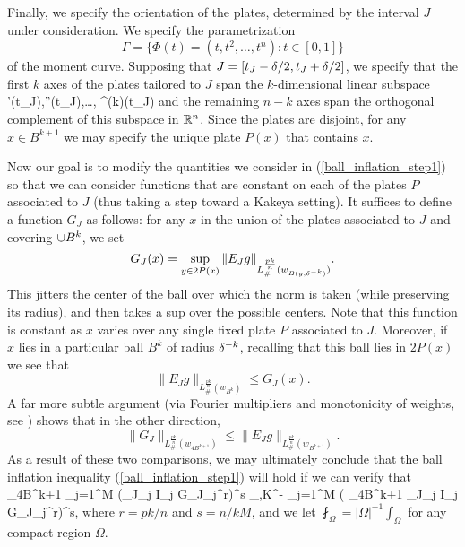 \documentclass[brochure,english,12pt]{bourbaki}%
\begin{document}
Finally, we specify the orientation of the plates, determined by the interval $J$ under consideration. We specify the parametrization 
\[ \Gamma = \{\Phi(t) = (t,t^2,\ldots, t^n): t \in [0,1]\}\]
of the moment curve. Supposing that $J = [t_J - \delta/2,t_J +\delta/2]$, we specify that the first $k$ axes of the plates tailored to $J$ span the $k$-dimensional linear subspace 
\beq\label{plate_orientation}
 \langle \Phi'(t_J),\Phi''(t_J),\ldots, \Phi^{(k)}(t_J)\rangle 
 \eeq
and the remaining $n-k$ axes span the orthogonal complement of this subspace in $\mathbb{R}^n$. 
Since the plates are disjoint, for any $x \in B^{k+1}$ we may specify the unique plate $P(x)$ that contains $x$. 


Now our goal is to modify the quantities we consider in (\ref{ball_inflation_step1}) so that we can consider functions that are constant on each of the plates $P$ associated to $J$ (thus taking a step toward a Kakeya setting). 
It suffices to define a function $G_J$ as follows: for any $x$ in the union of the plates associated to $J$ and covering $\cup B^k$, we set 
\[ G_J (x) = \sup_{y \in 2P(x)} \| E_J g\|_{L^{\frac{pk}{n}}_\# (w_{B(y,\delta^{-k})})}.\]
This jitters the center of the ball over which the norm is taken (while preserving its radius), and then takes a sup over the possible centers. Note that this function is constant as $x$ varies over any single fixed plate $P$ associated to $J$. Moreover, if $x$ lies in a particular ball $B^k$ of radius $\delta^{-k}$, recalling that this ball lies in $2P(x)$ we see that 
\[ \| E_J g\|_{L^{\frac{pk}{n}}_\# (w_{B^k})} \leq G_J(x).\]
A far more subtle argument (via Fourier multipliers and monotonicity of weights, see \cite[Thm. 6.6]{BDG16}) shows that in the other direction,
\[  \| G_J \|_{L^{\frac{pk}{n}}_\# (w_{4B^{k+1}})} \leq  \| E_J g\|_{L^{\frac{pk}{n}}_\# (w_{B^{k+1}})}.\]
As a result of these two comparisons, we may ultimately conclude that the ball inflation inequality (\ref{ball_inflation_step1}) will hold if we can verify that 
\beq\label{ball_inflation_step2}
 \fint_{4B^{k+1}} \prod_{j=1}^M (\sum_{J_j \subset I_j} G_{J_j}^r)^s
 	\ll_{\ep,K}\del^{-\ep} \prod_{j=1}^M (  \fint_{4B^{k+1}} \sum_{J_j \subset I_j} G_{J_j}^r)^s,
\eeq
where $r=pk/n$ and $s = n/kM$, and we let $\fint_{\Omega} = |\Omega|^{-1} \int_\Omega$ for any compact region $\Omega$.
\end{document}
